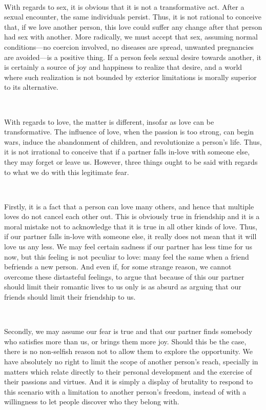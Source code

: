 \documentclass[a4paper, 12pt]{article}
\begin{document}
~ 

With regards to sex, it is obvious that it is not a transformative act. After a
sexual encounter, the same individuals persist. Thus, it is not rational to
conceive that, if we love another person, this love could suffer any change
after that person had sex with another. More radically, we must accept that 
sex, assuming normal conditions---no coercion involved, no diseases are spread,
unwanted pregnancies are avoided---is a positive thing. If a person feels sexual 
desire towards another, it is certainly a source of joy and happiness to
realize that desire, and a world where such realization is not bounded by
exterior limitations is morally superior to its alternative. 

~ 

With regards to love, the matter is different, insofar as love can be
transformative. The influence of love, when the passion is too strong, can
begin wars, induce the abandonment of children, and revolutionize a person's
life. Thus, it is not irrational to conceive that if a partner falls in-love
with someone else, they may forget or leave us. However, three things ought to
be said with regards to what we do with this legitimate fear.

~ 

Firstly, it is a fact that a person can love many others, and hence that
multiple loves do not cancel each other out. This is obviously true in 
friendship and it is a moral mistake not to acknowledge that it is true in 
all other kinds of love. Thus, if our partner falls in-love with someone else,
it really does not mean that it will love us any less. We may feel certain
sadness if our partner has less time for us now, but this feeling is not
peculiar to love: many feel the same when a friend befriends a new person. And
even if, for some strange reason, we cannot overcome these distasteful
feelings, to argue that because of this our partner should limit their romantic 
lives to us only is as absurd as arguing that our friends should limit their 
friendship to us. 

~ 

Secondly, we may assume our fear is true and that our partner finds somebody
who satisfies more than us, or brings them more joy. Should this be the case,
there is no non-selfish reason not to allow them to explore the opportunity. We
have absolutely no right to limit the scope of another person's reach,
specially in matters which relate directly to their personal development and
the exercise of their passions and virtues. And it is simply a display of
brutality to respond to this scenario with a limitation to another person's
freedom, instead of with a willingness to let people discover who they belong
with.
\end{document}
